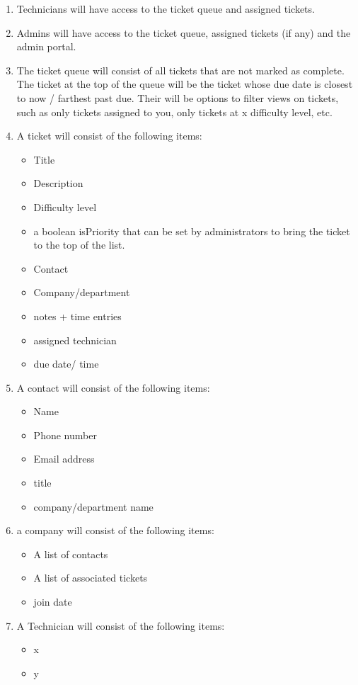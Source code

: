 \documentclass[letterpaper]{article}
\begin{document}
\begin{enumerate}
	\item Technicians will have access to the ticket queue and assigned tickets.
	\item Admins will have access to the ticket queue, assigned tickets (if any) and the admin portal.
	\item The ticket queue will consist of all tickets that are not marked as complete. The ticket at the top of the queue will be the ticket whose due date is closest to now / farthest past due. Their will be options to filter views on tickets, such as only tickets assigned to you, only tickets at x difficulty level, etc.
	\item A ticket will consist of the following items:
	      \begin{itemize}
		      \item  Title
		      \item  Description
		      \item Difficulty level
		      \item a boolean isPriority that can be set by administrators to bring the ticket to the top of the list.
		      \item  Contact
		      \item Company/department
		      \item notes + time entries
		      \item assigned technician
		      \item due date/ time
	      \end{itemize}
	\item A contact will consist of the following items:
	      \begin{itemize}
		      \item Name
		      \item Phone number
		      \item Email address
		      \item title
		      \item company/department name
	      \end{itemize}
	\item a company will consist of the following items:
	      \begin{itemize}
		      \item A list of contacts
		      \item A list of associated tickets
		      \item join date
	      \end{itemize}
  \item A Technician will consist of the following items:
        \begin{itemize}
          \item x
          \item y
        \end{itemize}

\end{enumerate}
\pagebreak
\end{document}
